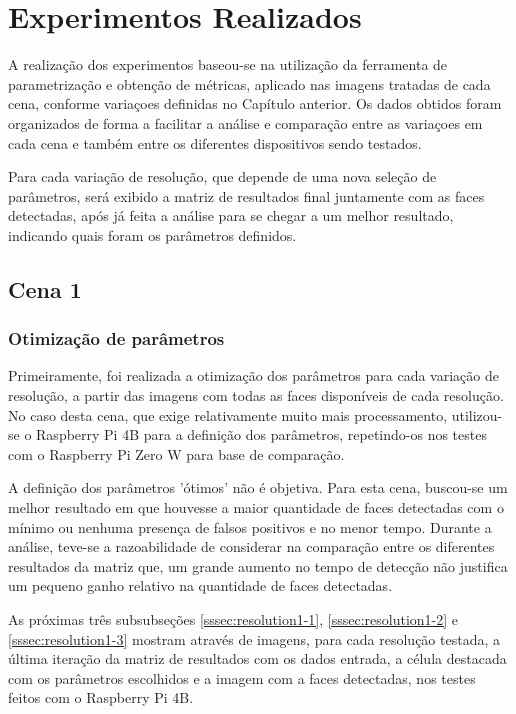 \chapter{Experimentos Realizados}
\thispagestyle{plain}
\label{cap:experimentos}
\graphicspath{{./Cap4_Experimentos_Realizados/Figures/}}

A realização dos experimentos baseou-se na utilização da ferramenta de parametrização e obtenção de métricas, aplicado nas imagens tratadas de cada cena, conforme variaçoes definidas no Capítulo anterior. Os dados obtidos foram organizados de forma a facilitar a análise e comparação entre as variaçoes em cada cena e também entre os diferentes dispositivos sendo testados.

Para cada variação de resolução, que depende de uma nova seleção de parâmetros, será exibido a matriz de resultados final juntamente com as faces detectadas, após já feita a análise para se chegar a um melhor resultado, indicando quais foram os parâmetros definidos.

\section{Cena 1}

\subsection{Otimização de parâmetros}

Primeiramente, foi realizada a otimização dos parâmetros para cada variação de resolução, a partir das imagens com todas as faces disponíveis de cada resolução. No caso desta cena, que exige relativamente muito mais processamento, utilizou-se o Raspberry Pi 4B para a definição dos parâmetros, repetindo-os nos testes com o Raspberry Pi Zero W para base de comparação.

A definição dos parâmetros 'ótimos' não é objetiva. Para esta cena, buscou-se um melhor resultado em que houvesse a maior quantidade de faces detectadas com o mínimo ou nenhuma presença de falsos positivos e no menor tempo. Durante a análise, teve-se a razoabilidade de considerar na comparação entre os diferentes resultados da matriz que, um grande aumento no tempo de detecção não justifica um pequeno ganho relativo na quantidade de faces detectadas.

As próximas três subsubseções \ref{sssec:resolution1-1}, \ref{sssec:resolution1-2} e \ref{sssec:resolution1-3} mostram através de imagens, para cada resolução testada, a última iteração da matriz de resultados com os dados entrada, a célula destacada com os parâmetros escolhidos e a imagem com a faces detectadas, nos testes feitos com o Raspberry Pi 4B. 

